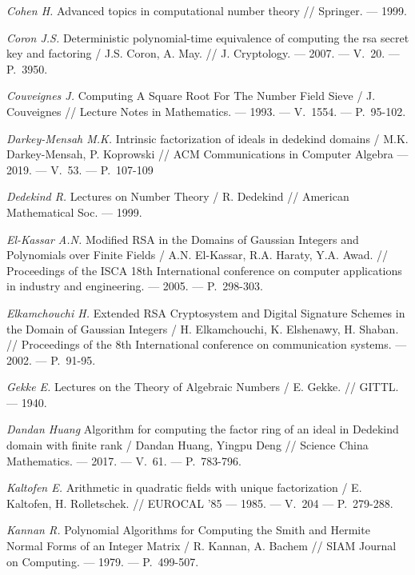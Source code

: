 \begin{thebibliography}{99}
    \textit{Cohen H.} Advanced topics in computational number theory // Springer. --- 1999.
    
    \textit{Coron J.S.} Deterministic polynomial-time equivalence of computing the rsa secret key and factoring / J.S. Coron, A. May. // J. Cryptology. --- 2007. --- V.~20. --- P.~3950.

    \textit{Couveignes J.} Computing A Square Root For The Number Field Sieve / J. Couveignes // Lecture Notes in Mathematics. --- 1993. --- V.~1554. --- P.~95-102.

    \textit{Darkey-Mensah M.K.} Intrinsic factorization of ideals in dedekind domains / M.K. Darkey-Mensah, P. Koprowski // ACM Communications in Computer Algebra --- 2019. --- V.~53. --- P.~107-109

    \textit{Dedekind R.} Lectures on Number Theory / R. Dedekind // American Mathematical Soc. --- 1999.

    \textit{El-Kassar A.N.} Modified RSA in the Domains of Gaussian Integers and Polynomials over Finite Fields / A.N. El-Kassar, R.A. Haraty, Y.A. Awad. // Proceedings of the ISCA 18th International conference on computer applications in industry and engineering. --- 2005. --- P.~298-303.

    \textit{Elkamchouchi H.} Extended RSA Cryptosystem and Digital Signature Schemes in the Domain of Gaussian Integers / H. Elkamchouchi, K. Elshenawy, H. Shaban. // Proceedings of the 8th International conference on communication systems. --- 2002. --- P.~91-95.

    \textit{Gekke E.} Lectures on the Theory of Algebraic Numbers / E. Gekke. // GITTL. --- 1940.

    \textit{Dandan Huang} Algorithm for computing the factor ring of an ideal in Dedekind domain with finite rank / Dandan Huang, Yingpu Deng // Science China Mathematics. --- 2017. --- V.~61. --- P.~783-796.

    \textit{Kaltofen E.} Arithmetic in quadratic fields with unique factorization / E. Kaltofen, H. Rolletschek. // EUROCAL '85 --- 1985. --- V.~204 --- P.~279-288.

    \textit{Kannan R.} Polynomial Algorithms for Computing the Smith and Hermite Normal Forms of an Integer Matrix / R. Kannan, A. Bachem // SIAM Journal on Computing. --- 1979. --- P.~499-507.


\end{thebibliography}
